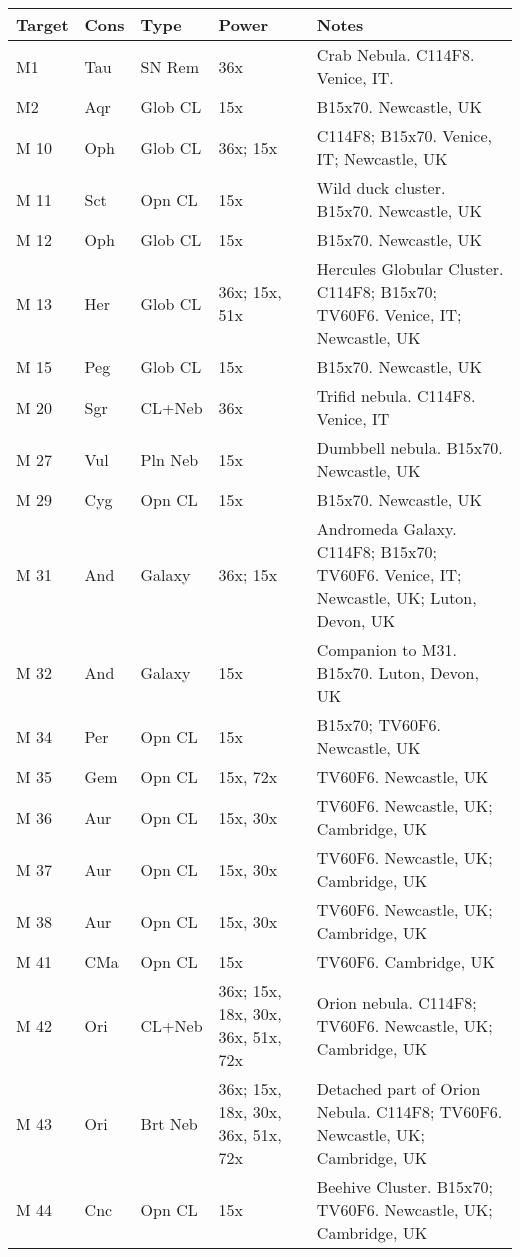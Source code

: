 \begin{longtable}{ p{0.8in}  p{0.3in}  p{0.5in}  p{0.9in}  p{5.8in} }
\hline 
{\bf Target} & {\bf Cons} & {\bf Type} & {\bf Power} & {\bf Notes} \\ 
\hline 
M1 & Tau & SN Rem & 36x & Crab Nebula. C114F8. Venice, IT. \\ 
M2 & Aqr & Glob CL & 15x & B15x70. Newcastle, UK \\ 
M 10 & Oph & Glob CL & 36x; 15x & C114F8; B15x70. Venice, IT; Newcastle, UK \\ 
M 11 & Sct & Opn CL & 15x & Wild duck cluster. B15x70. Newcastle, UK \\ 
M 12 & Oph & Glob CL & 15x & B15x70. Newcastle, UK \\ 
M 13 & Her & Glob CL & 36x; 15x, 51x & Hercules Globular Cluster. C114F8; B15x70; TV60F6. Venice, IT; Newcastle, UK \\ 
M 15 & Peg & Glob CL & 15x & B15x70. Newcastle, UK \\ 
M 20 & Sgr & CL+Neb & 36x & Trifid nebula. C114F8. Venice, IT \\ 
M 27 & Vul & Pln Neb & 15x & Dumbbell nebula. B15x70. Newcastle, UK \\ 
M 29 & Cyg & Opn CL & 15x & B15x70. Newcastle, UK \\ 
M 31 & And & Galaxy & 36x; 15x & Andromeda Galaxy. C114F8; B15x70; TV60F6. Venice, IT; Newcastle, UK; Luton, Devon, UK \\ 
M 32 & And & Galaxy & 15x & Companion to M31. B15x70. Luton, Devon, UK \\ 
M 34 & Per & Opn CL & 15x & B15x70; TV60F6. Newcastle, UK \\ 
M 35 & Gem & Opn CL & 15x, 72x & TV60F6. Newcastle, UK \\ 
M 36 & Aur & Opn CL & 15x, 30x & TV60F6. Newcastle, UK; Cambridge, UK \\ 
M 37 & Aur & Opn CL & 15x, 30x & TV60F6. Newcastle, UK; Cambridge, UK \\ 
M 38 & Aur & Opn CL & 15x, 30x & TV60F6. Newcastle, UK; Cambridge, UK \\ 
M 41 & CMa & Opn CL & 15x & TV60F6. Cambridge, UK \\ 
M 42 & Ori & CL+Neb & 36x; 15x, 18x, 30x, 36x, 51x, 72x & Orion nebula. C114F8; TV60F6. Newcastle, UK; Cambridge, UK \\ 
M 43 & Ori & Brt Neb & 36x; 15x, 18x, 30x, 36x, 51x, 72x & Detached part of Orion Nebula. C114F8; TV60F6. Newcastle, UK; Cambridge, UK \\ 
M 44 & Cnc & Opn CL & 15x & Beehive Cluster. B15x70; TV60F6. Newcastle, UK; Cambridge, UK \\ 

\end{longtable}
